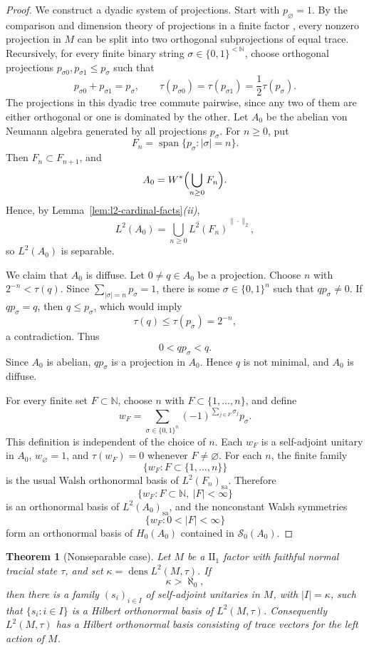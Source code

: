 \documentclass[11pt,letterpaper,reqno]{amsart}
\newtheorem{thm}{Theorem}[section]
\theoremstyle{definition}
\numberwithin{equation}{section}
\newcommand{\sa}{\mathrm{sa}}
\newcommand{\one}{1}
\DeclareMathOperator{\spanop}{span}
\DeclareMathOperator{\dens}{dens}
\begin{document}
\begin{proof}
We construct a dyadic system of projections.  Start with $p_\varnothing=1$.
By the comparison and dimension theory of projections in a finite factor
\cite[Ch.~6]{KR97II}, every nonzero projection in $M$ can be split into two
orthogonal subprojections of equal trace.  Recursively, for every finite
binary string $\sigma\in\{0,1\}^{<\mathbb N}$, choose orthogonal projections
$p_{\sigma 0},p_{\sigma 1}\leq p_\sigma$ such that
\[
   p_{\sigma 0}+p_{\sigma 1}=p_\sigma,
   \qquad
   \tau(p_{\sigma 0})=\tau(p_{\sigma 1})=\frac12\tau(p_\sigma).
\]
The projections in this dyadic tree commute pairwise, since any two of them
are either orthogonal or one is dominated by the other. Let \(A_0\) be the abelian von Neumann algebra generated by all projections
\(p_\sigma\). For \(n\geq0\), put
\[
   F_n=\spanop\{p_\sigma:|\sigma|=n\}.
\]
Then \(F_n\subset F_{n+1}\), and
\[
   A_0=W^*\Bigl(\bigcup_{n\geq0}F_n\Bigr).
\]
Hence, by Lemma~\ref{lem:l2-cardinal-facts}\emph{(ii)},
\[
   L^2(A_0)=
   \overline{\bigcup_{n\geq0}L^2(F_n)}^{\|\cdot\|_2},
\]
so \(L^2(A_0)\) is separable.

We claim that \(A_0\) is diffuse.  Let \(0\neq q\in A_0\) be a projection.
Choose \(n\) with \(2^{-n}<\tau(q)\).  Since
\(\sum_{|\sigma|=n}p_\sigma=\one\), there is some \(\sigma\in\{0,1\}^n\)
such that \(qp_\sigma\neq0\).  If \(qp_\sigma=q\), then \(q\le p_\sigma\),
which would imply
\[
   \tau(q)\leq\tau(p_\sigma)=2^{-n},
\]
a contradiction.  Thus
\[
   0<qp_\sigma<q.
\]
Since \(A_0\) is abelian, \(qp_\sigma\) is a projection in \(A_0\).  Hence
\(q\) is not minimal, and \(A_0\) is diffuse.

For every finite set \(F\subset\mathbb N\), choose \(n\) with
\(F\subset\{1,\ldots,n\}\), and define
\[
   w_F
   =
   \sum_{\sigma\in\{0,1\}^n}
   (-1)^{\sum_{j\in F}\sigma_j}p_\sigma .
\]
This definition is independent of the choice of \(n\).  Each \(w_F\) is a
self-adjoint unitary in \(A_0\), \(w_\varnothing=\one\), and
\(\tau(w_F)=0\) whenever \(F\neq\varnothing\).  For each \(n\), the finite
family
\[
   \{w_F:F\subset\{1,\ldots,n\}\}
\]
is the usual Walsh orthonormal basis of \(L^2(F_n)_{\sa}\). Therefore
\[
   \{w_F:F\subset\mathbb N,\ |F|<\infty\}
\]
is an orthonormal basis of \(L^2(A_0)_{\sa}\), and the nonconstant Walsh
symmetries
\[
   \{w_F:0<|F|<\infty\}
\]
form an orthonormal basis of \(H_0(A_0)\) contained in
\(\mathcal S_0(A_0)\).
\end{proof}

\begin{thm}[Nonseparable case]\label{thm:nonseparable-main}
Let $M$ be a $\mathrm{II}_1$ factor with faithful normal tracial state $\tau$,
and set
\(\kappa=\dens L^2(M,\tau)\).  If
\[
   \kappa>\aleph_0,
\]
then there is a family \((s_i)_{i\in I}\) of self-adjoint unitaries in $M$, with
\(|I|=\kappa\), such that \(\{\widehat{s_i}:i\in I\}\) is a Hilbert
orthonormal basis of $L^2(M,\tau)$.  Consequently $L^2(M,\tau)$ has a Hilbert
orthonormal basis consisting of trace vectors for the left action of $M$.
\end{thm}
\end{document}
